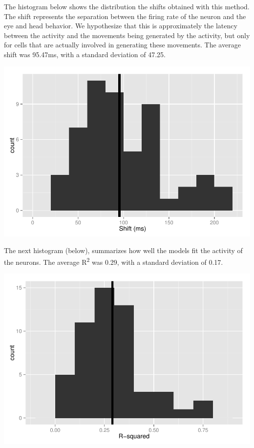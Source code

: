 \documentclass[]{article}
\begin{document}
The histogram below shows the distribution the shifts obtained with this
method. The shift represents the separation between the firing rate of
the neuron and the eye and head behavior. We hypothesize that this is
approximately the latency between the activity and the movements being
generated by the activity, but only for cells that are actually involved
in generating these movements. The average shift was 95.47ms, with a
standard deviation of 47.25.

\includegraphics{NRGRecord_files/figure-latex/shift_histogram-1.pdf}

The next histogram (below), summarizes how well the models fit the
activity of the neurons. The average R\textsuperscript{2} was 0.29, with
a standard deviation of 0.17.

\includegraphics{NRGRecord_files/figure-latex/rsquared_histogram-1.pdf}
\end{document}
